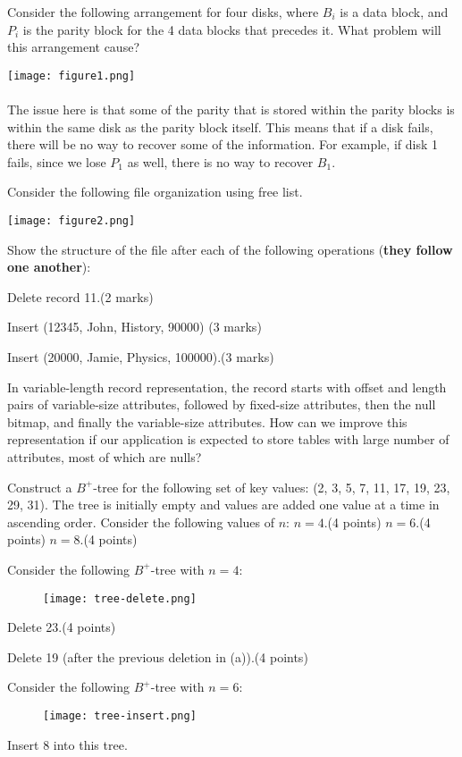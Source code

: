 \documentclass[a4 paper]{article}
\begin{document}
Consider the following arrangement for four disks, where $B_{i}$ is a data block, and $P_{i}$ is the parity block for the 4 data blocks that precedes it. What problem will this arrangement cause?

{\centering \texttt{[image: figure1.png]}}\\\\

The issue here is that some of the parity that is stored within the parity blocks is within the same disk as the parity block itself. This means that if a disk fails, there will be no way to recover some of the information. For example, if disk 1 fails, since we lose $P_1$ as well, there is no way to recover $B_1$.



Consider the following file organization using free list.

{\centering \texttt{[image: figure2.png]}}

Show the structure of the file after each of the following operations (\textbf{they follow one another}):

 Delete record 11.\indent (2 marks)


 Insert (12345, John, History, 90000) (3 marks)


 Insert (20000, Jamie, Physics, 100000).\indent (3 marks)




In variable-length record representation, the record starts with offset and length pairs of variable-size attributes, followed by fixed-size attributes, then the null bitmap, and finally the variable-size attributes. How can we improve this representation if our application is expected to store tables with large number of attributes, most of which are nulls?



Construct a $B^{+}$-tree for the following set of key values: (2, 3, 5, 7, 11, 17, 19, 23, 29, 31). The tree is initially empty and values are added one value at a time in ascending order. Consider the following values of $n$:
 $n = 4$.\indent \indent (4 points)
 $n = 6$.\indent \indent (4 points)
 $n = 8$.\indent \indent (4 points)



Consider the following $B^{+}$-tree with $n = 4$:
\begin{figure}[h]
\texttt{[image: tree-delete.png]}
\end{figure}

 Delete 23.\indent \indent (4 points)

 Delete 19 (after the previous deletion in (a)).\indent \indent (4 points)

Consider the following $B^{+}$-tree with $n = 6$:
\begin{figure}[h]
\texttt{[image: tree-insert.png]}
\end{figure}
Insert 8 into this tree.
\end{document}
